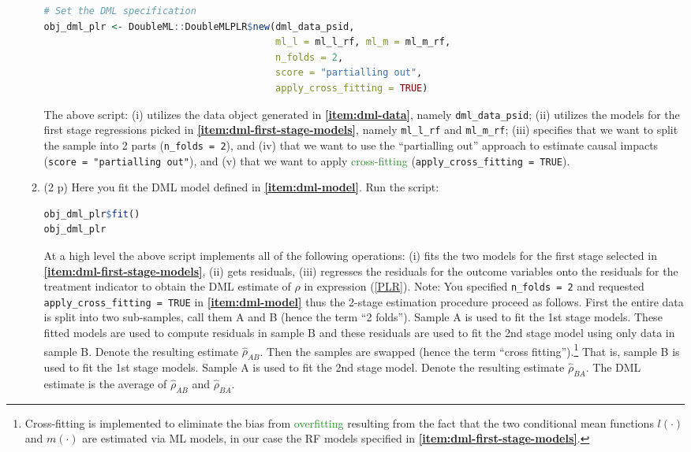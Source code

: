 \documentclass{article}
\begin{document}
\begin{enumerate}[label=\textbf{Q\arabic{enumi}}.,ref=Q\arabic{enumi}, wide=0pt, itemsep=0em, topsep=5pt, labelindent=0pt, resume]
\begin{enumerate}
\begin{lstlisting}[language=R]
# Set the DML specification
obj_dml_plr <- DoubleML::DoubleMLPLR$new(dml_data_psid, 
                                         ml_l = ml_l_rf, ml_m = ml_m_rf, 
                                         n_folds = 2,
                                         score = "partialling out",
                                         apply_cross_fitting = TRUE)
\end{lstlisting}
The above script: (i) utilizes the data object generated in \textbf{\ref{item:dml-data}}, namely \texttt{dml\_data\_psid}; (ii) utilizes the models for the first stage regressions picked in \textbf{\ref{item:dml-first-stage-models}}, namely \texttt{ml\_l\_rf} and \texttt{ml\_m\_rf}; (iii) specifies that we want to split the sample into 2 parts (\texttt{n\_folds = 2}), and (iv) that we want to use the ``partialling out'' approach to estimate causal impacts (\texttt{score = "partialling out"}), and (v) that we want to apply \textcolor{ForestGreen}{cross-fitting} (\texttt{apply\_cross\_fitting = TRUE}).\label{item:dml-model}
\item (2 p) Here you fit the DML model defined in \textbf{\ref{item:dml-model}}. Run the script:
\begin{lstlisting}[language=R]
obj_dml_plr$fit()
obj_dml_plr
\end{lstlisting}
At a high level the above script implements all of the following operations: (i) fits the two models for the first stage selected in \textbf{\ref{item:dml-first-stage-models}}, (ii) gets residuals, (iii) regresses the residuals for the outcome variables onto the residuals for the treatment indicator to obtain the DML estimate of $\rho$ in expression (\ref{PLR}). Note: You specified \texttt{n\_folds = 2} and requested \texttt{apply\_cross\_fitting = TRUE} in \textbf{\ref{item:dml-model}} thus the 2-stage estimation procedure proceed as follows. First the entire data is split into two sub-samples, call them A and B (hence the term ``2 folds''). Sample A is used to fit the 1st stage models. These fitted models are used to compute residuals in sample B and these residuals are used to fit the 2nd stage model using only data in sample B. Denote the resulting estimate $\hat{\rho}_{AB}$. Then the samples are swapped (hence the term ``cross fitting'').\footnote{Cross-fitting is implemented to eliminate the bias from \textcolor{ForestGreen}{overfitting} resulting from the fact that the two conditional mean functions $l(\cdot)$ and $m(\cdot)$ are estimated via ML models, in our case the RF models specified in \textbf{\ref{item:dml-first-stage-models}}.} That is, sample B is used to fit the 1st stage models. Sample A is used to fit the 2nd stage model. Denote the resulting estimate $\hat{\rho}_{BA}$. The DML estimate is the average of $\hat{\rho}_{AB}$ and $\hat{\rho}_{BA}$. 


\end{enumerate}
\end{enumerate}
\end{document}
